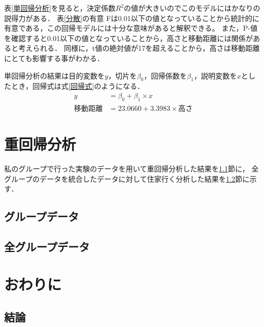 \documentclass[titlepage,a4paper]{jsarticle}
\begin{document}
表\ref{単回帰分析}を見ると，決定係数$R^{2}$の値が大きいのでこのモデルにはかなりの説得力がある．
表\ref{分散}の有意 Fは0.01以下の値となっていることから統計的に有意である，この回帰モデルには十分な意味があると解釈できる。
また，P-値を確認すると0.01以下の値となっていることから，高さと移動距離には関係があると考えられる．
同様に，t値の絶対値が17を超えることから，高さは移動距離にとても影響する事がわかる．

単回帰分析の結果は目的変数を$y$，切片を$\beta_{0}$，回帰係数を$\beta_{1}$，説明変数を$x$としたとき，回帰式は式\eqref{回帰式}のようになる．
\begin{align}
  y    & = \beta_{0} + \beta_{1} \times x         \\
  移動距離 & = 23.0660 + 3.3983 \times 高さ \label{回帰式}
\end{align}


\section{重回帰分析}
私のグループで行った実験のデータを用いて重回帰分析した結果を\ref{グループデータ}節に，
全グループのデータを統合したデータに対して住家行く分析した結果を\ref{全グループデータ}節に示す．
\subsection{グループデータ}\label{グループデータ}

\subsection{全グループデータ}\label{全グループデータ}

\section{おわりに}
\subsection{結論}
\end{document}
